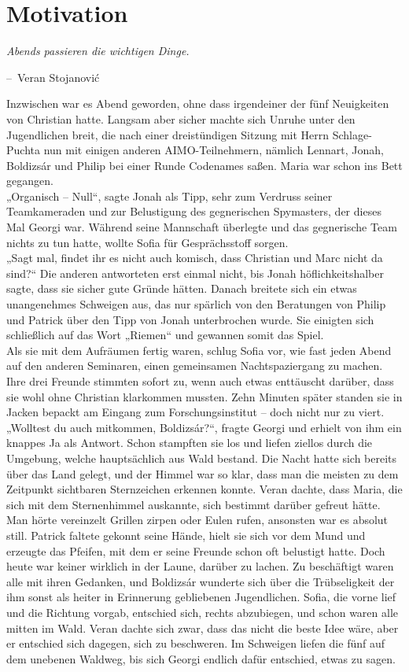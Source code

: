 \documentclass[oneside]{memoir}
\makeatletter
\newenvironment{chapquote}[2][2em]
  {\setlength{\@tempdima}{#1}%
   \def\chapquote@author{#2}%
   \parshape 1 \@tempdima \dimexpr\textwidth-2\@tempdima\relax%
   \itshape}
  {\par\normalfont\hfill--\ \chapquote@author\hspace*{\@tempdima}\par\bigskip}
\makeatother
\begin{document}
\chapter{Motivation} %
\begin{chapquote}{Veran Stojanović}
\glqq Abends passieren die wichtigen Dinge.\grqq
\end{chapquote}
Inzwischen war es Abend geworden, ohne dass irgendeiner der fünf Neuigkeiten von Christian hatte. Langsam aber sicher machte sich Unruhe unter den Jugendlichen breit, die nach einer dreistündigen Sitzung mit Herrn Schlage-Puchta nun mit einigen anderen AIMO-Teilnehmern, nämlich Lennart, Jonah, Boldizsár und Philip bei einer Runde Codenames saßen. Maria war schon ins Bett gegangen. \\
„Organisch – Null“, sagte Jonah als Tipp, sehr zum Verdruss seiner Teamkameraden und zur Belustigung des gegnerischen Spymasters, der dieses Mal Georgi war.
Während seine Mannschaft überlegte und das gegnerische Team nichts zu tun hatte, wollte Sofia für Gesprächsstoff sorgen. \\
„Sagt mal, findet ihr es nicht auch komisch, dass Christian und Marc nicht da sind?“
Die anderen antworteten erst einmal nicht, bis Jonah höflichkeitshalber sagte, dass sie sicher gute Gründe hätten. Danach breitete sich ein etwas unangenehmes Schweigen aus, das nur spärlich von den Beratungen von Philip und Patrick über den Tipp von Jonah unterbrochen wurde. Sie einigten sich schließlich auf das Wort „Riemen“ und gewannen somit das Spiel. \\
Als sie mit dem Aufräumen fertig waren, schlug Sofia vor, wie fast jeden Abend auf den anderen Seminaren, einen gemeinsamen Nachtspaziergang zu machen. Ihre drei Freunde stimmten sofort zu, wenn auch etwas enttäuscht darüber, dass sie wohl ohne Christian klarkommen mussten. Zehn Minuten später standen sie in Jacken bepackt am Eingang zum Forschungsinstitut – doch nicht nur zu viert. \\
„Wolltest du auch mitkommen, Boldizsár?“, fragte Georgi und erhielt von ihm ein knappes Ja als Antwort. Schon stampften sie los und liefen ziellos durch die Umgebung, welche hauptsächlich aus Wald bestand. Die Nacht hatte sich bereits über das Land gelegt, und der Himmel war so klar, dass man die meisten zu dem Zeitpunkt sichtbaren Sternzeichen erkennen konnte. Veran dachte, dass Maria, die sich mit dem Sternenhimmel auskannte, sich bestimmt darüber gefreut hätte. Man hörte vereinzelt Grillen zirpen oder Eulen rufen, ansonsten war es absolut still. Patrick faltete gekonnt seine Hände, hielt sie sich vor dem Mund und erzeugte das Pfeifen, mit dem er seine Freunde schon oft belustigt hatte. Doch heute war keiner wirklich in der Laune, darüber zu lachen. Zu beschäftigt waren alle mit ihren Gedanken, und Boldizsár wunderte sich über die Trübseligkeit der ihm sonst als heiter in Erinnerung gebliebenen Jugendlichen. Sofia, die vorne lief und die Richtung vorgab, entschied sich, rechts abzubiegen, und schon waren alle mitten im Wald. Veran dachte sich zwar, dass das nicht die beste Idee wäre, aber er entschied sich dagegen, sich zu beschweren. Im Schweigen liefen die fünf auf dem unebenen Waldweg, bis sich Georgi endlich dafür entschied, etwas zu sagen. \\
\end{document}
